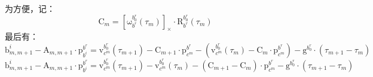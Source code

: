 \documentclass[12pt, onecolumn]{article}
\newcommand\liehat[1]{\left[ #1 \right]_\times}
\newcommand\bsm[1]{\boldsymbol{\mathrm{#1}}}
\newcommand\rotation[2]{{\bsm{R}_{#1}^{#2}}}
\newcommand\angvel[2]{{\bsm{\omega}_{#1}^{#2}}}
\newcommand\translation[2]{{\bsm{p}_{#1}^{#2}}}
\newcommand\linvel[2]{{\bsm{v}_{#1}^{#2}}}
\newcommand\gravity[1]{{\bsm{g}^{#1}}}
\begin{document}
	为方便，记：
	\begin{equation}
	\bsm{C}_m=\liehat{\angvel{b^r}{b^r_0}(\tau_m)}\cdot\rotation{b^r}{b^r_0}(\tau_m)
	\end{equation}
	最后有：
	\begin{equation}
	\bsm{b}^i_{m,m+1}-\bsm{A}_{m,m+1}\cdot\translation{b^i}{b^r}=
	\linvel{c^m}{b^r_0}(\tau_{m+1})-\bsm{C}_{m+1}\cdot\translation{c^m}{b^r}
	-\left(\linvel{c^m}{b^r_0}(\tau_{m})-\bsm{C}_{m}\cdot\translation{c^m}{b^r} \right) -\gravity{b^r_0}\cdot\left(\tau_{m+1}-\tau_m \right) 
	\end{equation}
	\begin{equation}
	\bsm{b}^i_{m,m+1}-\bsm{A}_{m,m+1}\cdot\translation{b^i}{b^r}=
	\linvel{c^m}{b^r_0}(\tau_{m+1})-\linvel{c^m}{b^r_0}(\tau_{m})
	-\left( \bsm{C}_{m+1}-\bsm{C}_{m}\right) \cdot\translation{c^m}{b^r}
	-\gravity{b^r_0}\cdot\left(\tau_{m+1}-\tau_m \right) 
	\end{equation}
	
\end{document}
